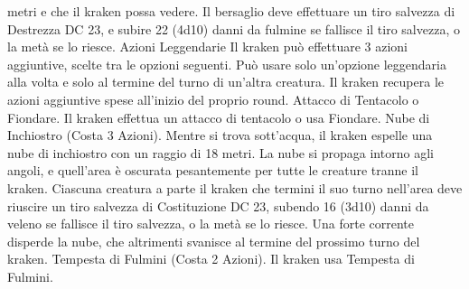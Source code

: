\begin{multicols}{2}
metri e che il kraken possa vedere. Il bersaglio deve effettuare un
tiro salvezza di Destrezza DC 23, e subire 22 (4d10) danni da
fulmine se fallisce il tiro salvezza, o la metà se lo riesce.
Azioni Leggendarie
Il kraken può effettuare 3 azioni aggiuntive, scelte tra le opzioni
seguenti. Può usare solo un’opzione leggendaria alla volta e solo
al termine del turno di un’altra creatura. Il kraken recupera le
azioni aggiuntive spese all’inizio del proprio round.
Attacco di Tentacolo o Fiondare. Il kraken effettua un attacco
di tentacolo o usa Fiondare.
Nube di Inchiostro (Costa 3 Azioni). Mentre si trova
sott’acqua, il kraken espelle una nube di inchiostro con un raggio
di 18 metri. La nube si propaga intorno agli angoli, e quell’area è
oscurata pesantemente per tutte le creature tranne il kraken.
Ciascuna creatura a parte il kraken che termini il suo turno
nell’area deve riuscire un tiro salvezza di Costituzione DC 23,
subendo 16 (3d10) danni da veleno se fallisce il tiro salvezza, o
la metà se lo riesce. Una forte corrente disperde la nube, che
altrimenti svanisce al termine del prossimo turno del kraken.
Tempesta di Fulmini (Costa 2 Azioni). Il kraken usa Tempesta
di Fulmini.
 

\end{multicols}
